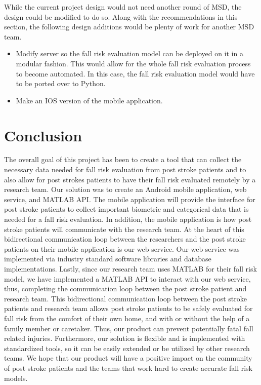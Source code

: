 \documentclass[conference]{IEEEtran}
\begin{document}
While the current project design would not need another round of MSD, the design could be modified to do so. Along with the recommendations in this section, the following design additions would be plenty of work for another MSD team.

\begin{itemize}
    \item Modify server so the fall risk evaluation model can be deployed on it in a modular fashion. This would allow for the whole fall risk evaluation process to become automated. In this case, the fall risk evaluation model would have to be ported over to Python.
    \item Make an IOS version of the mobile application.
\end{itemize}

\section{Conclusion}

The overall goal of this project has been to create a tool that can collect the necessary data needed for fall risk evaluation from post stroke patients and to also allow for post strokes patients to have their fall risk evaluated remotely by a research team. Our solution was to create an Android mobile application, web service, and MATLAB API. The mobile application will provide the interface for post stroke patients to collect important biometric and categorical data that is needed for a fall risk evaluation. In addition, the mobile application is how post stroke patients will communicate with the research team. At the heart of this bidirectional communication loop between the researchers and the post stroke patients on their mobile application is our web service. Our web service was implemented via industry standard software libraries and database implementations. Lastly, since our research team uses MATLAB for their fall risk model, we have implemented a MATLAB API to interact with our web service, thus, completing the communication loop between the post stroke patient and research team. This bidirectional communication loop between the post stroke patients and research team allows post stroke patients to be safely evaluated for fall risk from the comfort of their own home, and with or without the help of a family member or caretaker. Thus, our product can prevent potentially fatal fall related injuries. Furthermore, our solution is flexible and is implemented with standardized tools, so it can be easily extended or be utilized by other research teams. We hope that our product will have a positive impact on the community of post stroke patients and the teams that work hard to create accurate fall risk models.



\end{document}
